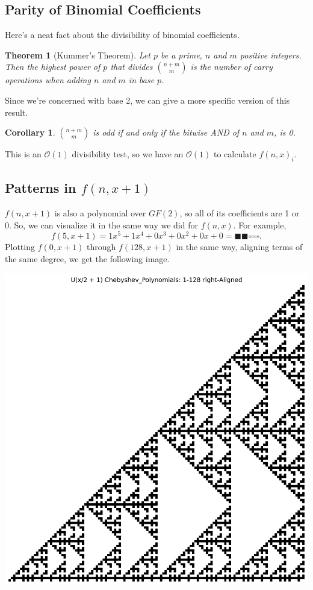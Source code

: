 \documentclass{article}
\newtheorem{theorem}{Theorem}
\newtheorem{corollary}{Corollary}
\renewcommand{\O}{\mathcal{O}}
\begin{document}
	\subsection{Parity of Binomial Coefficients}
	Here's a neat fact about the divisibility of binomial coefficients.
	\begin{theorem}[Kummer's Theorem]
		Let $p$ be a prime, $n$ and $m$ positive integers.
		Then the highest power of $p$ that divides $\binom{n+m}{m}$ is the number of carry operations when adding $n$ and $m$ in base $p$.
	\end{theorem}
	
	Since we're concerned with base 2, we can give a more specific version of this result.
	\begin{corollary}
		$\binom{n+m}{m}$ is odd if and only if the bitwise AND of $n$ and $m$, is 0.
	\end{corollary}
	This is an $\O(1)$ divisibility test, so we have an $\O(1)$ to calculate $f(n,x)_i$.
	
	
	\subsection{Patterns in $f(n,x+1)$}
	$f(n,x+1)$ is also a polynomial over $GF(2)$, so all of its coefficients are 1 or 0.
	So, we can visualize it in the same way we did for $f(n,x)$.
	For example,
	\begin{equation*}
		f(5,x+1) = 1x^5 + 1x^4 + 0x^3 + 0x^2 + 0x + 0 = \blacksquare\blacksquare\square\square\square\square.
	\end{equation*}
	Plotting $f(0,x+1)$ through $f(128,x+1)$ in the same way, aligning terms of the same degree, we get the following image.
	
	\begin{center}
		\includegraphics[width=.8\textwidth]{../../code/serialization/chebyshev/chebyshev2_right_128.png}	
	\end{center}
\end{document}
